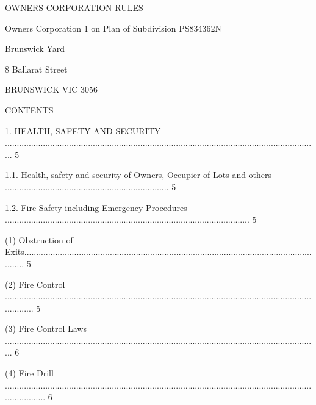 \documentclass{article}
\begin{document}





{\fontsize{13.98}{1}OWNERS CORPORATION RULES }

{\fontsize{10.98}{1}Owners Corporation 1 on Plan of Subdivision PS834362N }

{\fontsize{10.98}{1}Brunswick Yard }

{\fontsize{10.98}{1}8 Ballarat Street }

{\fontsize{10.98}{1}BRUNSWICK VIC 3056 }

\newpage



















{\fontsize{10.02}{1}CONTENTS }

{\fontsize{9.99}{1}1. HEALTH, SAFETY AND SECURITY .................................................................................................................................... 5 }

{\fontsize{9.99}{1}1.1. Health, safety and security of Owners, Occupier of Lots and others ..................................................................... 5 }

{\fontsize{9.99}{1}1.2. Fire Safety including Emergency Procedures ....................................................................................................... 5 }

{\fontsize{9.962}{1}(1) Obstruction of Exits................................................................................................................................. 5 }

{\fontsize{9.962}{1}(2) Fire Control ............................................................................................................................................. 5 }

{\fontsize{9.962}{1}(3) Fire Control Laws .................................................................................................................................... 6 }

{\fontsize{9.962}{1}(4) Fire Drill .................................................................................................................................................. 6 }
\end{document}
